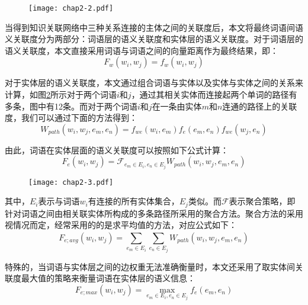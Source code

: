 \begin{figure}[!ht]
    \centerline{\texttt{[image: chap2-2.pdf]}}
    \label{chap2-2}
\end{figure}

当得到知识关联网络中三种关系连接的主体之间的关联度后，本文将最终词语间语义关联度分为两部分：词语层的语义关联度和实体层的语义关联度。对于词语层的语义关联度，本文直接采用词语与词语之间的向量距离作为最终结果，即：
\begin{equation}
F_w(w_i, w_j) = f_{w}(w_i, w_j)
\label{F_w}
\end{equation}

\noindent 对于实体层的语义关联度，本文通过组合词语与实体以及实体与实体之间的关系来计算，如图\ref{chap2-3}所示对于两个词语$i$和$j$，通过其相关实体而连接起两个单词的路径有多条，图中有12条。而对于两个词语$i$和$j$在一条由实体$m$和$n$连通的路径上的关联度，我们可以通过下面的方法得到：
\begin{equation}
    W_{path}(w_i, w_j, e_m, e_n) = f_{we}(w_i, e_m)f_e(e_m, e_n)f_{we}(w_j, e_n)
    \label{wpath}
\end{equation}

\noindent 由此，词语在实体层面的语义关联度可以按照如下公式计算：
\begin{equation}
    F_e(w_i, w_j) = \mathscr{F}_{e_m \in E_i,e_n \in E_j}W_{path}(w_i, w_j, e_m, e_n)
    \label{F_e}
\end{equation}

\begin{figure}[!ht]
    \centerline{\texttt{[image: chap2-3.pdf]}}
    \label{chap2-3}
\end{figure}

\noindent 其中，$E_i$表示与词语$w_i$有连接的所有实体集合，$E_j$类似。而$\mathscr{F}$表示聚合策略，即针对词语之间由相关联实体所构成的多条路径所采用的聚合方法。聚合方法的采用视情况而定，经常采用的的是求平均值的方法，对应公式如下：
\begin{equation}
    F_{e;avg}(w_i, w_j) = \sum_{e_m \in E_i}^{ }\sum_{e_n \in E_j}^{ }W_{path}(w_i, w_j, e_m, e_n)
    \label{F_e_avg}
\end{equation}

\noindent 特殊的，当词语与实体层之间的边权重无法准确衡量时，本文还采用了取实体间关联度最大值的策略来衡量词语在实体层的语义信息：
\begin{equation}
    F_{e;max}(w_i, w_j) = \max_{e_m \in E_i,e_n \in E_j}f_e(e_m, e_n)
    \label{F_e_max}
\end{equation}

